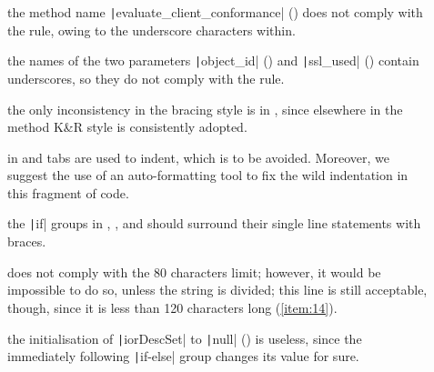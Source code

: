 \begin{description}

	\item []
		the method name \texttt|evaluate_client_conformance| () does not comply with the rule, owing to the underscore characters within.
	
	\item []
		the names of the two parameters \texttt|object_id| () and \texttt|ssl_used| () contain underscores, so they do not comply with the rule. 
	
	\item []
		the only inconsistency in the bracing style is in , since elsewhere in the method K\&R style is consistently adopted.

	
\end{description}


\begin{description}

	\item [] 
		in  and  tabs are used to indent, which is to be avoided. Moreover, we suggest the use of an auto-formatting tool to fix the wild indentation in this fragment of code.

	\item [] 
		
		the \texttt|if| groups in , , and  should surround their single line statements with braces. 
		
	\item []
			does not comply with the 80 characters limit; however, it would be impossible to do so, unless the string is divided; this line is still acceptable, though, since it is less than 120 characters long (\cref{item:14}).
		
	\item []
		the initialisation of \texttt|iorDescSet| to \texttt|null| () is useless, since the immediately following \texttt|if-else| group changes its value for sure.

\end{description}

